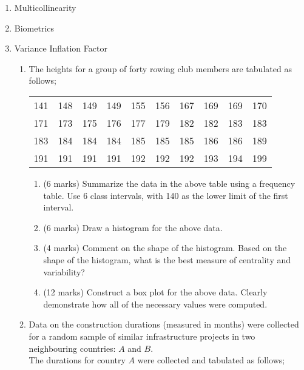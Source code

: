 \begin{enumerate}
	\item Multicollinearity
	\item Biometrics
	\item Variance Inflation Factor
	\begin{enumerate}
		\item The heights for a group of forty rowing club members are tabulated as follows;
		
		\begin{table}[ht]
			\begin{center}
				\begin{tabular}{|rrrrrrrrrr|}
					
					\hline
					141 & 148 & 149 & 149 & 155 & 156 & 167 & 169 & 169 & 170 \\
					171 & 173 & 175 & 176 & 177 & 179 & 182 & 182 & 183 & 183 \\
					183 & 184 & 184 & 184 & 185 & 185 & 185 & 186 & 186 & 189 \\
					191 & 191 & 191 & 191 & 192 & 192 & 192 & 193 & 194 & 199 \\
					\hline
				\end{tabular}
			\end{center}
		\end{table}
		\vspace{-0.5cm}
		\begin{enumerate}
			\item (6 marks) Summarize the data in the above table using a frequency table. Use 6 class intervals, with 140 as the lower limit of the first interval.
			\item (6 marks) Draw a histogram for the above data.
			\item (4 marks) Comment on the shape of the histogram. Based on the shape of the histogram, what is the best measure of centrality and variability?
			\item (12 marks) Construct a box plot for the above data. Clearly demonstrate how all of the necessary values were computed.
		\end{enumerate}
		\vspace{0.25cm}
		\item Data on the construction durations (measured in months) were collected for a random sample of similar infrastructure projects in two neighbouring countries: $A$ and $B$.\\
		The durations for country $A$ were collected and tabulated as follows;
		
		\begin{table}[ht]
			\begin{center}
				\begin{tabular}{|rrrrrrr|}
					

\end{tabular}
\end{center}
\end{table}
\end{enumerate}
\end{enumerate}
